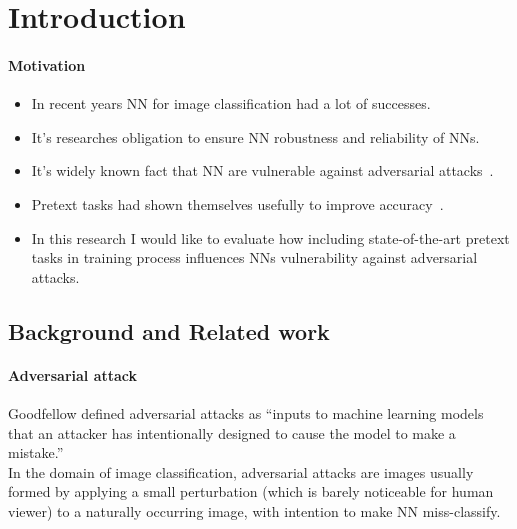 \section{Introduction}


\paragraph{Motivation}
\begin{itemize}
    \item In recent years NN for image classification had a lot of successes.
    \item It's researches obligation to ensure NN robustness and reliability of NNs.
    \item It’s widely known fact that NN are vulnerable against adversarial attacks~\cite{ilyas2019adversarial}.
    \item Pretext tasks had shown themselves usefully to improve accuracy~\cite{kolesnikov2019revisiting}.
    \item In this research I would like to evaluate how including state-of-the-art pretext tasks in training
    process influences NNs vulnerability against adversarial attacks.
\end{itemize}

\subsection{Background and Related work}

\paragraph{Adversarial attack}
Goodfellow defined adversarial attacks as “inputs to machine learning models that an
attacker has intentionally designed to cause the model to make a mistake.” ~\cite{DBLP:journals/corr/abs-1802-08195} \\
In the domain of image classification, adversarial attacks are images usually formed by applying a small perturbation
(which is barely noticeable for human viewer) to a naturally occurring image, with intention to make NN miss-classify.

